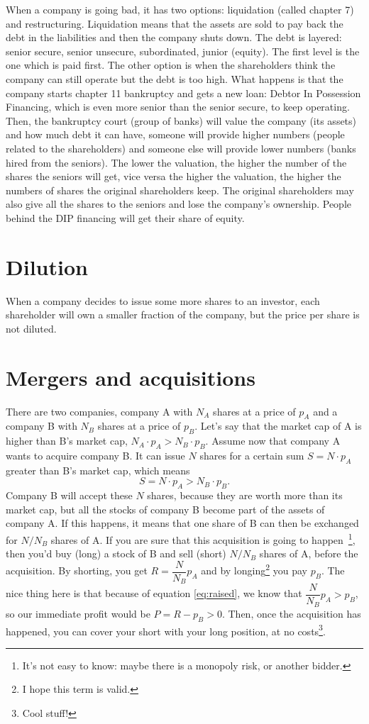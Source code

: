 When a company is going bad, it has two options: liquidation (called chapter 7) and restructuring. Liquidation means that the assets are sold to pay back the debt in the liabilities and then the company shuts down. The debt is layered: senior secure, senior unsecure, subordinated, junior (equity). The first level is the one which is paid first. The other option is when the shareholders think the company can still operate but the debt is too high. What happens is that the company starts chapter 11 bankruptcy and gets a new loan: Debtor In Possession Financing, which is even more senior than the senior secure, to keep operating. Then, the bankruptcy court (group of banks) will value the company (its assets) and how much debt it can have, someone will provide higher numbers (people related to the shareholders) and someone else will provide lower numbers (banks hired from the seniors). The lower the valuation, the higher the number of the shares the seniors will get, vice versa the higher the valuation, the higher the numbers of shares the original shareholders keep. The original shareholders may also give all the shares to the seniors and lose the company's ownership. People behind the DIP financing will get their share of equity. 

\section{Dilution}
When a company decides to issue some more shares to an investor, each shareholder will own a smaller fraction of the company, but the price per share is not diluted.

\section{Mergers and acquisitions}
There are two companies, company A with $N_A$ shares at a price of $p_A$ and a company B with $N_B$ shares at a price of $p_B$. Let's say that the market cap of A is higher than B's market cap, $N_A \cdot p_A > N_B \cdot p_B$. Assume now that company A wants to acquire company B. It can issue $N$ shares for a certain sum $S = N\cdot p_A$ greater than B's market cap, which means
\begin{equation}\label{eq:raised}
    S = N\cdot p_A > N_B \cdot p_B.
\end{equation}
Company B will accept these $N$ shares, because they are worth more than its market cap, but all the stocks of company B become part of the assets of company A. If this happens, it means that one share of B can then be exchanged for $N/N_B$ shares of A. If you are sure that this acquisition is going to happen~\footnote{It's not easy to know: maybe there is a monopoly risk, or another bidder.}, then you'd buy (long) a stock of B and sell (short) $N/N_B$ shares of A, before the acquisition. By shorting, you get $R = \dfrac{N}{N_B}p_A$ and by longing\footnote{I hope this term is valid.} you pay $p_B$. The nice thing here is that because of equation \ref{eq:raised}, we know that $\dfrac{N}{N_B}p_A > p_B$, so our immediate profit would be $P = R - p_B > 0$. Then, once the acquisition has happened, you can cover your short with your long position, at no costs\footnote{Cool stuff!}.

